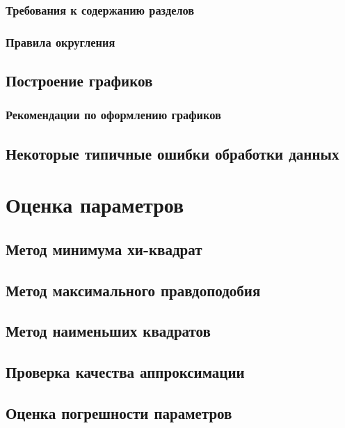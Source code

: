 \documentclass[12pt]{article}
\begin{document}
      \subsubsection{Требования к содержанию разделов}

      \subsubsection{Правила округления}

    \subsection{Построение графиков}

      \subsubsection{Рекомендации по оформлению графиков}

    \subsection{Некоторые типичные ошибки обработки данных}

  \section{Оценка параметров}

    \subsection{Метод минимума хи-квадрат}

    \subsection{Метод максимального правдоподобия}

    \subsection{Метод наименьших квадратов}

    \subsection{Проверка качества аппроксимации}

    \subsection{Оценка погрешности параметров}
\end{document}

